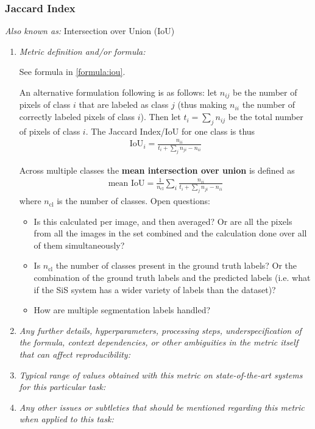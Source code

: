 \documentclass[a4paper,11pt]{article}
\begin{document}
        \subsubsection{Jaccard Index}
            \textit{Also known as:} Intersection over Union (IoU)
            \begin{enumerate}[label=\alph*.]
                \item \textit{Metric definition and/or formula:}

                    See formula in \ref{formula:iou}.

                    An alternative formulation following \cite{long2015fully} is as follows: let $n_{ij}$ be the number of pixels of class $i$ that are labeled as class $j$ (thus making $n_{ii}$ the number of correctly labeled pixels of class $i$). Then let $t_i = \sum_{j} n_{ij}$ be the total number of pixels of class $i$. The Jaccard Index/IoU for one class is thus
                    \begin{align}
                        \textrm{IoU}_i = \frac{n_{ii}}{t_i + \sum_j n_{ji} - n_{ii}}
                    \end{align}

                    Across multiple classes the \textbf{mean intersection over union} is defined as
                    \begin{align}
                        \textrm{mean IoU} = \frac{1}{n_\textrm{cl}} \sum_{i} \frac{n_{ii}}{t_i + \sum_j n_{ji} - n_{ii}}
                    \end{align}
                    where $n_\textrm{cl}$ is the number of classes.
                    Open questions:
                    \begin{itemize}
                        \item Is this calculated per image, and then averaged? Or are all the pixels from all the images in the set combined and the calculation done over all of them simultaneously?
                        \item Is $n_\textrm{cl}$ the number of classes present in the ground truth labels? Or the combination of the ground truth labels and the predicted labels (i.e. what if the SiS system has a wider variety of labels than the dataset)?
                        \item How are multiple segmentation labels handled?
                    \end{itemize}
                \bigskip
                \item \textit{Any further details, hyperparameters, processing steps, underspecification of the formula, context dependencies, or other ambiguities in the metric itself that can affect reproducibility:}
                \bigskip
                \item \textit{Typical range of values obtained with this metric on state-of-the-art systems for this particular task:}
                \bigskip
                \item \textit{Any other issues or subtleties that should be mentioned regarding this metric when applied to this task:}
                \bigskip
            \end{enumerate}
\end{document}
